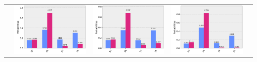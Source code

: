 \documentclass[11pt]{article}
\begin{document}
\begin{table}[h!]
\begin{tabular}{| c | c | c | c | c | }
\begin{minipage}{.215\textwidth}
      \end{minipage}&
      \begin{minipage}{.215\textwidth}
        \includegraphics[width=\linewidth]{img/one_qecc3_Y01.png}
      \end{minipage}
      &\begin{minipage}{.215\textwidth}
        \includegraphics[width=\linewidth]{img/one_qecc3_Z01.png}
      \end{minipage}
      &\begin{minipage}{.215\textwidth}
        \includegraphics[width=\linewidth]{img/one_qecc3_I01.png}

\end{minipage}
\end{tabular}
\end{table}
\end{document}
